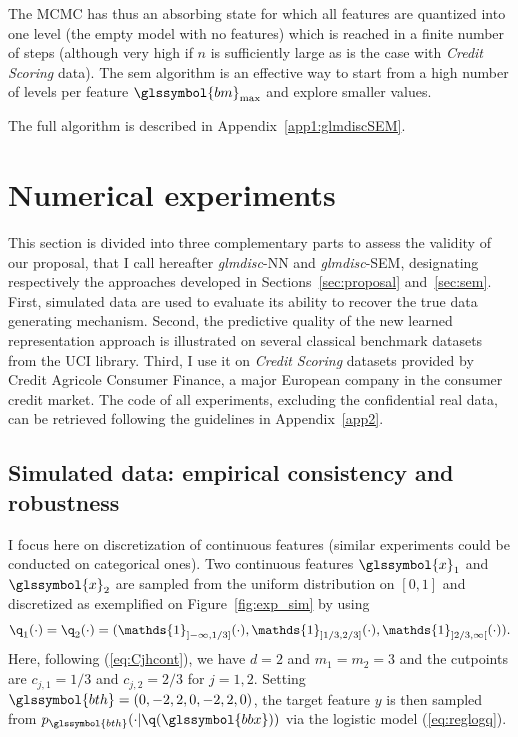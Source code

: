The MCMC has thus an absorbing state for which all features are quantized into one level (the empty model with no features) which is reached in a finite number of steps (although very high if $n$ is sufficiently large as is the case with \textit{Credit Scoring} data). The \gls{sem} algorithm is an effective way to start from a high number of levels per feature $\glssymbol{bm}_{\max}$ and explore smaller values.

The full algorithm is described in Appendix~\ref{app1:glmdiscSEM}.

\section{Numerical experiments} \label{sec:experiments}

This section is divided into three complementary parts to assess the validity of our proposal, that I call hereafter \textit{glmdisc}-NN and \textit{glmdisc}-SEM, designating respectively the approaches developed in Sections~\ref{sec:proposal} and~\ref{sec:sem}. First, simulated data are used to evaluate its ability to recover the true data generating mechanism. Second, the predictive quality of the new learned representation approach is illustrated on several classical benchmark datasets from the UCI library. Third, I use it on \textit{Credit Scoring} datasets provided by Credit Agricole Consumer Finance, a major European company in the consumer credit market. The code of all experiments, excluding the confidential real data, can be retrieved following the guidelines in Appendix~\ref{app2}.


\subsection{Simulated data: empirical consistency and robustness}

I focus here on discretization of continuous features (similar experiments could be conducted on categorical ones). Two continuous features $\glssymbol{x}_1$ and $\glssymbol{x}_2$ are sampled from the uniform distribution on $[0,1]$ and discretized as exemplified on Figure~\ref{fig:exp_sim} by using
\[\q_1(\cdot)=\q_2(\cdot) = (\mathds{1}_{]-\infty,1/3]}(\cdot),\mathds{1}_{]1/3,2/3]}(\cdot),\mathds{1}_{]2/3,\infty[}(\cdot)).\]
Here, following (\ref{eq:Cjhcont}), we have $d=2$ and $m_1=m_2=3$ and the cutpoints are $c_{j,1}=1/3$ and $c_{j,2}=2/3$ for $j=1,2$. Setting $\glssymbol{bth}=(0,-2,2,0,-2,2,0)$, the target feature $y$ is then sampled from $p_{\glssymbol{bth}}(\cdot | \q(\glssymbol{bbx}))$ via the logistic model (\ref{eq:reglogq}).

